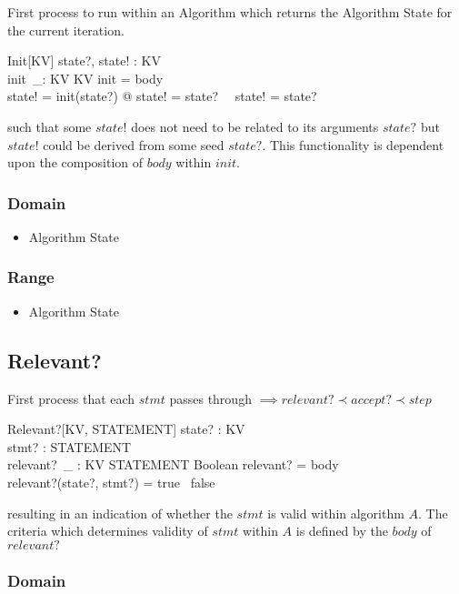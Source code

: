 \documentclass[../main.tex]{subfiles}
\begin{document}
First process to run within an Algorithm which returns the Algorithm State for the current iteration.

\begin{schema}{Init[KV]}
  state?, state! : KV \\
  init~\_: KV \surj KV
  \where
  init = \langle body \rangle \\
  state! = init(state?) @ state! = state? ~\lor ~state! \not = state?
\end{schema}
such that some $state!$ does not need to be related to its arguments $state?$
but $state!$ could be derived from some seed $state?$.
This functionality is dependent upon the composition of $body$ within $init$.
\subsubsection{Domain}

\begin{itemize}
\item Algorithm State
\end{itemize}

\subsubsection{Range}

\begin{itemize}
\item Algorithm State
\end{itemize}

\subsection{Relevant?}

First process that each $stmt$ passes through $\implies relevant? \prec accept? \prec step$
\begin{schema}{Relevant?[KV, STATEMENT]}
  state? : KV \\
  stmt? : STATEMENT \\
  relevant?~\_ : KV \cross STATEMENT \fun Boolean
  \where
  relevant? = \langle body \rangle \\
  relevant?(state?, stmt?) = true ~\lor false
\end{schema}
resulting in an indication of whether the $stmt$ is valid within algorithm $A$.
The criteria which determines validity of $stmt$ within $A$ is defined by the $body$ of $relevant?$

\subsubsection{Domain}
\end{document}
